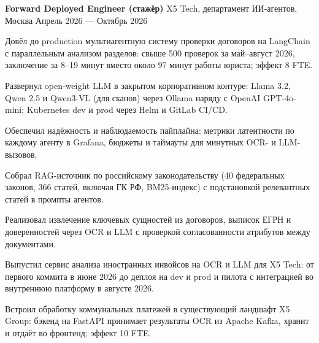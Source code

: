 \documentclass[10pt,a4paper]{article}
\newcommand{\cventry}[3]{%
  \textbf{#1} \textbar{} #3 \textbar{} #2\par\vspace{1pt}}
\begin{document}
\cventry{Forward Deployed Engineer (стажёр)}{Апрель 2026 --- Октябрь 2026}{X5 Tech, департамент ИИ-агентов, Москва}
\begin{cvitems}
    \item Довёл до production мультиагентную систему проверки договоров на LangChain с параллельным анализом разделов: свыше 500 проверок за май--август 2026, заключение за 8--19 минут вместо около 97 минут работы юриста; эффект 8 FTE.
    \item Развернул open-weight LLM в закрытом корпоративном контуре: Llama 3.2, Qwen 2.5 и Qwen3-VL (для сканов) через Ollama наряду с OpenAI GPT-4o-mini; Kubernetes dev и prod через Helm и GitLab CI/CD.
    \item Обеспечил надёжность и наблюдаемость пайплайна: метрики латентности по каждому агенту в Grafana, бюджеты и таймауты для минутных OCR- и LLM-вызовов.
    \item Собрал RAG-источник по российскому законодательству (40 федеральных законов, 366 статей, включая ГК РФ, BM25-индекс) с подстановкой релевантных статей в промпты агентов.
    \item Реализовал извлечение ключевых сущностей из договоров, выписок ЕГРН и доверенностей через OCR и LLM с проверкой согласованности атрибутов между документами.
    \item Выпустил сервис анализа иностранных инвойсов на OCR и LLM для X5 Tech: от первого коммита в июне 2026 до деплоя на dev и prod и пилота с интеграцией во внутреннюю платформу в августе 2026.
    \item Встроил обработку коммунальных платежей в существующий ландшафт X5 Group: бэкенд на FastAPI принимает результаты OCR из Apache Kafka, хранит и отдаёт во фронтенд; эффект 10 FTE.
\end{cvitems}
\end{document}
